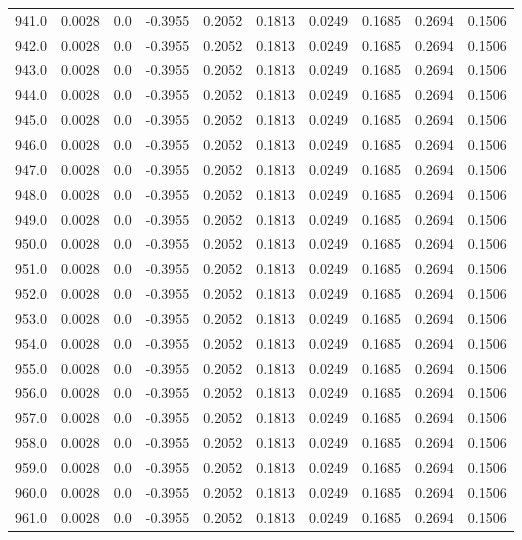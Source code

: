 \begin{longtable}{lrrrrrrrrr}
941.0 & 0.0028 & 0.0 & -0.3955 & 0.2052 & 0.1813 & 0.0249 & 0.1685 & 0.2694 & 0.1506 \\
942.0 & 0.0028 & 0.0 & -0.3955 & 0.2052 & 0.1813 & 0.0249 & 0.1685 & 0.2694 & 0.1506 \\
943.0 & 0.0028 & 0.0 & -0.3955 & 0.2052 & 0.1813 & 0.0249 & 0.1685 & 0.2694 & 0.1506 \\
944.0 & 0.0028 & 0.0 & -0.3955 & 0.2052 & 0.1813 & 0.0249 & 0.1685 & 0.2694 & 0.1506 \\
945.0 & 0.0028 & 0.0 & -0.3955 & 0.2052 & 0.1813 & 0.0249 & 0.1685 & 0.2694 & 0.1506 \\
946.0 & 0.0028 & 0.0 & -0.3955 & 0.2052 & 0.1813 & 0.0249 & 0.1685 & 0.2694 & 0.1506 \\
947.0 & 0.0028 & 0.0 & -0.3955 & 0.2052 & 0.1813 & 0.0249 & 0.1685 & 0.2694 & 0.1506 \\
948.0 & 0.0028 & 0.0 & -0.3955 & 0.2052 & 0.1813 & 0.0249 & 0.1685 & 0.2694 & 0.1506 \\
949.0 & 0.0028 & 0.0 & -0.3955 & 0.2052 & 0.1813 & 0.0249 & 0.1685 & 0.2694 & 0.1506 \\
950.0 & 0.0028 & 0.0 & -0.3955 & 0.2052 & 0.1813 & 0.0249 & 0.1685 & 0.2694 & 0.1506 \\
951.0 & 0.0028 & 0.0 & -0.3955 & 0.2052 & 0.1813 & 0.0249 & 0.1685 & 0.2694 & 0.1506 \\
952.0 & 0.0028 & 0.0 & -0.3955 & 0.2052 & 0.1813 & 0.0249 & 0.1685 & 0.2694 & 0.1506 \\
953.0 & 0.0028 & 0.0 & -0.3955 & 0.2052 & 0.1813 & 0.0249 & 0.1685 & 0.2694 & 0.1506 \\
954.0 & 0.0028 & 0.0 & -0.3955 & 0.2052 & 0.1813 & 0.0249 & 0.1685 & 0.2694 & 0.1506 \\
955.0 & 0.0028 & 0.0 & -0.3955 & 0.2052 & 0.1813 & 0.0249 & 0.1685 & 0.2694 & 0.1506 \\
956.0 & 0.0028 & 0.0 & -0.3955 & 0.2052 & 0.1813 & 0.0249 & 0.1685 & 0.2694 & 0.1506 \\
957.0 & 0.0028 & 0.0 & -0.3955 & 0.2052 & 0.1813 & 0.0249 & 0.1685 & 0.2694 & 0.1506 \\
958.0 & 0.0028 & 0.0 & -0.3955 & 0.2052 & 0.1813 & 0.0249 & 0.1685 & 0.2694 & 0.1506 \\
959.0 & 0.0028 & 0.0 & -0.3955 & 0.2052 & 0.1813 & 0.0249 & 0.1685 & 0.2694 & 0.1506 \\
960.0 & 0.0028 & 0.0 & -0.3955 & 0.2052 & 0.1813 & 0.0249 & 0.1685 & 0.2694 & 0.1506 \\
961.0 & 0.0028 & 0.0 & -0.3955 & 0.2052 & 0.1813 & 0.0249 & 0.1685 & 0.2694 & 0.1506 \\

\end{longtable}
